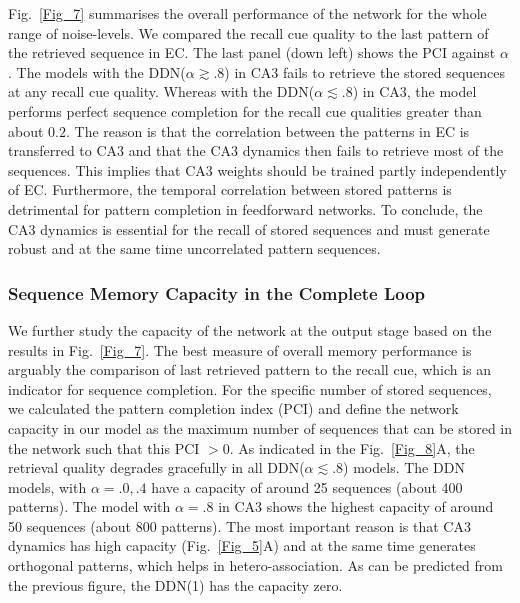 \documentclass[utf8]{frontiersSCNS} %
\begin{document}
%
Fig.~\ref{Fig_7} summarises the overall performance of the network for the whole range of noise-levels. We compared the recall cue quality to the last pattern of the retrieved sequence in EC.
%
The last panel (down left) shows the PCI against $\alpha$.
%
The models with the DDN($\alpha \gtrsim .8$) in CA3 fails to retrieve the stored sequences at any recall cue quality. Whereas with the DDN($\alpha \lesssim .8$) in CA3, the model performs perfect sequence completion for the recall cue qualities greater than about $0.2$.
%
The reason is that the correlation between the patterns in EC is transferred to CA3 and that the CA3 dynamics then fails to retrieve most of the sequences. This implies that CA3 weights should be trained partly independently of EC. Furthermore, the temporal correlation between stored patterns is detrimental for pattern completion in feedforward networks. 
To conclude, the CA3 dynamics is essential for the recall of stored sequences and must generate robust and at the same time uncorrelated pattern sequences.          

\subsubsection{Sequence Memory Capacity in the Complete Loop}

We further study the capacity of the network at the output stage based on the results in Fig.~\ref{Fig_7}. 
The best measure of overall memory performance is arguably the comparison of last retrieved pattern to the recall cue, which is an indicator for sequence completion.
%
For the specific number of stored sequences, we calculated the pattern completion index (PCI) and define the network capacity in our model as the maximum number of sequences that can be stored in the network such that this PCI $> 0$.
%
As indicated in the Fig.~\ref{Fig_8}A, the retrieval quality degrades gracefully in all DDN($\alpha \lesssim .8$)  models.
% 
The DDN models, with $\alpha = .0, .4$ have a capacity of around 25 sequences (about 400 patterns).
%
The model with $\alpha = .8$ in CA3 shows the highest capacity of around 50 sequences (about 800 patterns).
%
The most important reason is that CA3 dynamics has high capacity (Fig.~\ref{Fig_5}A) and at the same time generates orthogonal patterns, which helps in hetero-association.  
%
As can be predicted from the previous figure, the DDN(1) has the capacity zero. 
\end{document}
